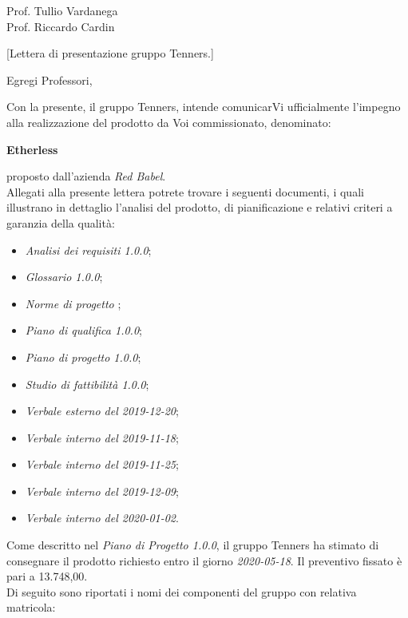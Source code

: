 \begin{letter}{\begin{flushright}
			Prof. Tullio Vardanega \\
			Prof. Riccardo Cardin 
	\end{flushright}}[Lettera di presentazione gruppo Tenners.]
\opening[Padova, ]{Egregi Professori,}
	\noindent Con la presente, il gruppo Tenners, intende comunicarVi ufficialmente l'impegno alla realizzazione del prodotto da Voi commissionato, denominato:
	\begin{center}
		\textbf{Etherless}
	\end{center}
    proposto dall'azienda \textit{Red Babel}. \\
    \noindent Allegati alla presente lettera potrete trovare i seguenti documenti, i quali illustrano in dettaglio l'analisi del prodotto, di pianificazione e relativi criteri a garanzia della qualità:
    \begin{itemize}
    	\item \textit{Analisi dei requisiti 1.0.0};
    	\item \textit{Glossario 1.0.0};
    	\item \textit{Norme di progetto };%
    	\item \textit{Piano di qualifica 1.0.0};
    	\item \textit{Piano di progetto 1.0.0};
    	\item \textit{Studio di fattibilità 1.0.0};
    	\item \textit{Verbale esterno del 2019-12-20};
    	\item \textit{Verbale interno del 2019-11-18};
    	\item \textit{Verbale interno del 2019-11-25};
    	\item \textit{Verbale interno del 2019-12-09};
    	\item \textit{Verbale interno del 2020-01-02}.
    \end{itemize}
    Come descritto nel \textit{Piano di Progetto 1.0.0}\docs, il gruppo Tenners ha stimato di consegnare il prodotto richiesto entro il giorno \textit{2020-05-18}. Il preventivo fissato è pari a 13.748,00\officialeuro.\\ 
    \noindent Di seguito sono riportati i nomi dei componenti del gruppo con relativa matricola:
    \begin{center}
    	\renewcommand{\arraystretch}{1.8}
    	

\end{center}
\end{letter}
